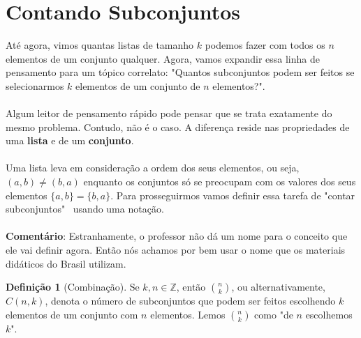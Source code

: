 \documentclass[a4paper,11pt,oneside]{book}
\theoremstyle{definition}
\theoremstyle{break}
\newtheorem{definition}{Definição}[section]
\begin{document}
\section{Contando Subconjuntos}

Até agora, vimos quantas listas de tamanho $k$ podemos fazer com todos os $n$ elementos de um conjunto qualquer. Agora, vamos expandir essa linha de pensamento para um tópico correlato: "Quantos subconjuntos podem ser feitos se selecionarmos $k$ elementos de um conjunto de $n$ elementos?". 
\\
\\
Algum leitor de pensamento rápido pode pensar que se trata exatamente do mesmo problema. Contudo, não é o caso. A diferença reside nas propriedades de uma \textbf{lista} e de um \textbf{conjunto}.
\\
\\
Uma lista leva em consideração a ordem dos seus elementos, ou seja, $(a,b) \neq (b,a)$ enquanto os conjuntos só se preocupam com os valores dos seus elementos $\{a,b\} = \{b,a\}$. Para prosseguirmos vamos definir essa tarefa de "contar subconjuntos" \ usando uma notação.
\\
\\
\textbf{Comentário}: Estranhamente, o professor não dá um nome para o conceito que ele vai definir agora. Então nós achamos por bem usar o nome que os materiais didáticos do Brasil utilizam.

\begin{definition}[Combinação]
Se $k,n \in \mathbb{Z}$, então $n \choose k$, ou alternativamente, $C(n,k)$, denota o número de subconjuntos que podem ser feitos escolhendo $k$ elementos de um conjunto com $n$ elementos. Lemos $n \choose k$ como "de $n$ escolhemos $k$".
\end{definition}
\end{document}
